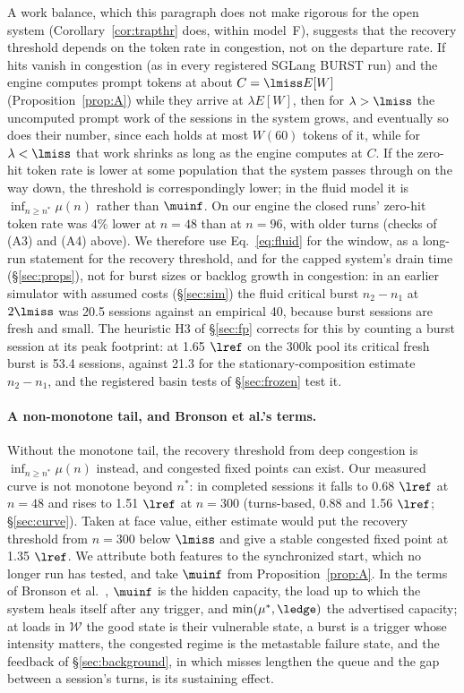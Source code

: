 A work balance, which this paragraph does not make rigorous for the open system (Corollary~\ref{cor:trapthr} does, within model~F), suggests that the recovery threshold depends on the token rate in congestion, not on the departure rate. If hits vanish in congestion (as in every registered SGLang BURST run) and the engine computes prompt tokens at about $C=\lmiss E[W]$ (Proposition~\ref{prop:A}) while they arrive at $\lambda E[W]$, then for $\lambda>\lmiss$ the uncomputed prompt work of the sessions in the system grows, and eventually so does their number, since each holds at most $W(60)$ tokens of it, while for $\lambda<\lmiss$ that work shrinks as long as the engine computes at $C$. If the zero-hit token rate is lower at some population that the system passes through on the way down, the threshold is correspondingly lower; in the fluid model it is $\inf_{n\ge n^*}\mu(n)$ rather than $\muinf$. On our engine the closed runs' zero-hit token rate was 4\% lower at $n=48$ than at $n=96$, with older turns (checks of (A3) and (A4) above). We therefore use Eq.~\eqref{eq:fluid} for the window, as a long-run statement for the recovery threshold, and for the capped system's drain time (\S\ref{sec:props}), not for burst sizes or backlog growth in congestion: in an earlier simulator with assumed costs (\S\ref{sec:sim}) the fluid critical burst $n_2-n_1$ at $2\lmiss$ was 20.5 sessions against an empirical 40, because burst sessions are fresh and small. The heuristic H3 of \S\ref{sec:fp} corrects for this by counting a burst session at its peak footprint: at 1.65 $\lref$ on the 300k pool its critical fresh burst is 53.4 sessions, against 21.3 for the stationary-composition estimate $n_2-n_1$, and the registered basin tests of \S\ref{sec:frozen} test it.

\paragraph{A non-monotone tail, and Bronson et al.'s terms.} Without the monotone tail, the recovery threshold from deep congestion is $\inf_{n\ge n^*}\mu(n)$ instead, and congested fixed points can exist. Our measured curve is not monotone beyond $n^*$: in completed sessions it falls to 0.68 $\lref$ at $n=48$ and rises to 1.51 $\lref$ at $n=300$ (turns-based, 0.88 and 1.56 $\lref$; \S\ref{sec:curve}). Taken at face value, either estimate would put the recovery threshold from $n=300$ below $\lmiss$ and give a stable congested fixed point at 1.35 $\lref$. We attribute both features to the synchronized start, which no longer run has tested, and take $\muinf$ from Proposition~\ref{prop:A}. In the terms of Bronson et al.~\citep{bronson2021metastable}, $\muinf$ is the hidden capacity, the load up to which the system heals itself after any trigger, and $\min(\mu^*,\ledge)$ the advertised capacity; at loads in $\mathcal W$ the good state is their vulnerable state, a burst is a trigger whose intensity matters, the congested regime is the metastable failure state, and the feedback of \S\ref{sec:background}, in which misses lengthen the queue and the gap between a session's turns, is its sustaining effect.

